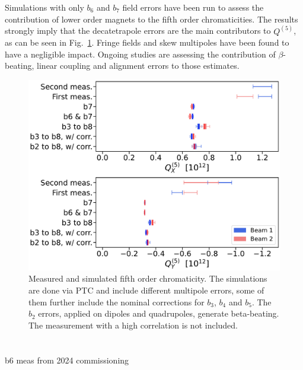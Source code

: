 Simulations with only $b_6$ and $b_7$ field errors have been run to assess the contribution of lower order magnets to the fifth order chromaticities. The results strongly imply that the decatetrapole errors are the main contributors to $Q^{(5)}$, as can be seen in Fig.~\ref{beam1_q5x_ptc}.
Fringe fields and skew multipoles have been found to have a negligible impact.
Ongoing studies are assessing the contribution of $\beta$-beating, linear coupling and alignment errors to those estimates.

\begin{figure}[tbh]
    \centering
    \includegraphics[width=1\columnwidth]{images/MOPL027_f4-1.pdf}
    \caption{Measured and simulated fifth order chromaticity. 
             The simulations are done via PTC and include different multipole errors, some of them further
             include the nominal corrections for $b_3$, $b_4$ and $b_5$.
             The $b_2$ errors, applied on dipoles and quadrupoles, generate beta-beating.
             The measurement with a high correlation is not included.}
    \label{beam1_q5x_ptc}
\end{figure}




\section{}

b6 meas from 2024 commissioning




